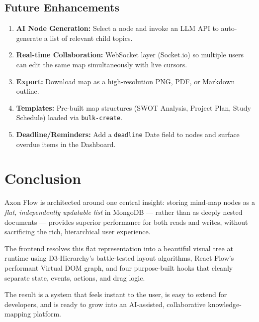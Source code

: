 \documentclass[12pt, a4paper]{article}
\begin{document}
\subsection{Future Enhancements}
\begin{enumerate}[noitemsep]
  \item \textbf{AI Node Generation:} Select a node and invoke an LLM API to auto-generate a list of relevant child topics.
  \item \textbf{Real-time Collaboration:} WebSocket layer (Socket.io) so multiple users can edit the same map simultaneously with live cursors.
  \item \textbf{Export:} Download map as a high-resolution PNG, PDF, or Markdown outline.
  \item \textbf{Templates:} Pre-built map structures (SWOT Analysis, Project Plan, Study Schedule) loaded via \texttt{bulk-create}.
  \item \textbf{Deadline/Reminders:} Add a \texttt{deadline} Date field to nodes and surface overdue items in the Dashboard.
\end{enumerate}

\section{Conclusion}
Axon Flow is architected around one central insight: storing mind-map nodes as a \textit{flat, independently updatable list} in MongoDB — rather than as deeply nested documents — provides superior performance for both reads and writes, without sacrificing the rich, hierarchical user experience.

The frontend resolves this flat representation into a beautiful visual tree at runtime using D3-Hierarchy's battle-tested layout algorithms, React Flow's performant Virtual DOM graph, and four purpose-built hooks that cleanly separate state, events, actions, and drag logic.

The result is a system that feels instant to the user, is easy to extend for developers, and is ready to grow into an AI-assisted, collaborative knowledge-mapping platform.

\end{document}
